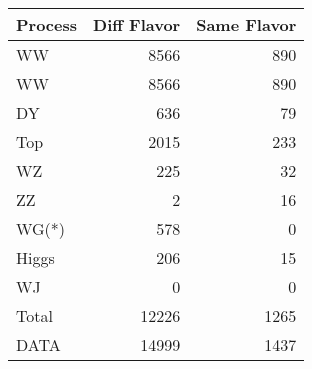 \begin{table}[ht]
	\centering
\begin{tabular}{lrr}

Process &  Diff Flavor &  Same Flavor \\
		\hline
     WW &         8566 &          890 \\
     WW &         8566 &          890 \\
     DY &          636 &           79 \\
    Top &         2015 &          233 \\
     WZ &          225 &           32 \\
     ZZ &            2 &           16 \\
  WG(*) &          578 &            0 \\
  Higgs &          206 &           15 \\
     WJ &            0 &            0 \\
\hline
  Total &        12226 &         1265 \\
   DATA &        14999 &         1437 \\


\end{tabular}

\end{table}